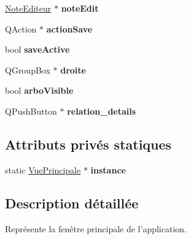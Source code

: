 \begin{DoxyCompactItemize}
\item 
\hypertarget{class_vue_principale_ac887b69330a47fc775a85a45fca3247e}{\hyperlink{class_note_editeur}{Note\-Editeur} $\ast$ {\bfseries note\-Edit}}\label{class_vue_principale_ac887b69330a47fc775a85a45fca3247e}

\item 
\hypertarget{class_vue_principale_a786106f1c4637d79748040b21e81876e}{Q\-Action $\ast$ {\bfseries action\-Save}}\label{class_vue_principale_a786106f1c4637d79748040b21e81876e}

\item 
\hypertarget{class_vue_principale_ae1ec36e06063e6097ce4e4c956142c6e}{bool {\bfseries save\-Active}}\label{class_vue_principale_ae1ec36e06063e6097ce4e4c956142c6e}

\item 
\hypertarget{class_vue_principale_a89b04596c58cd9ff7fa1a8526ed29289}{Q\-Group\-Box $\ast$ {\bfseries droite}}\label{class_vue_principale_a89b04596c58cd9ff7fa1a8526ed29289}

\item 
\hypertarget{class_vue_principale_aa0248272de083bb9cd0cb6a496daceb4}{bool {\bfseries arbo\-Visible}}\label{class_vue_principale_aa0248272de083bb9cd0cb6a496daceb4}

\item 
\hypertarget{class_vue_principale_a7c6eb51ba5b96ac5dca69fc3ffd65784}{Q\-Push\-Button $\ast$ {\bfseries relation\-\_\-details}}\label{class_vue_principale_a7c6eb51ba5b96ac5dca69fc3ffd65784}

\end{DoxyCompactItemize}
\subsection*{Attributs privés statiques}
\begin{DoxyCompactItemize}
\item 
\hypertarget{class_vue_principale_ac6d04800f0fbda43d2ec1127815c07de}{static \hyperlink{class_vue_principale}{Vue\-Principale} $\ast$ {\bfseries instance}}\label{class_vue_principale_ac6d04800f0fbda43d2ec1127815c07de}

\end{DoxyCompactItemize}


\subsection{Description détaillée}
Représente la fenêtre principale de l'application. 


